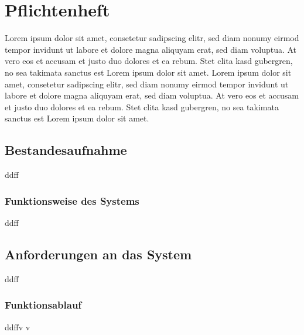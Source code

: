 \section{Pflichtenheft}
Lorem  ipsum dolor sit amet, consetetur sadipscing elitr, sed diam nonumy eirmod tempor invidunt ut labore et dolore magna aliquyam erat, sed diam voluptua. At vero eos et accusam et justo duo dolores et ea rebum. Stet clita kasd gubergren, no sea takimata sanctus est Lorem ipsum dolor sit amet. Lorem ipsum dolor sit amet, consetetur sadipscing elitr, sed diam nonumy eirmod tempor invidunt ut labore et dolore magna aliquyam erat, sed diam voluptua. At vero eos et accusam et justo duo dolores et ea rebum. Stet clita kasd gubergren, no sea takimata sanctus est Lorem ipsum dolor sit amet.
\subsection{Bestandesaufnahme}
ddff
\subsubsection{Funktionsweise des Systems}
ddff
\subsection{Anforderungen an das System}
ddff
\subsubsection{Funktionsablauf}
ddffv
v
\clearpage